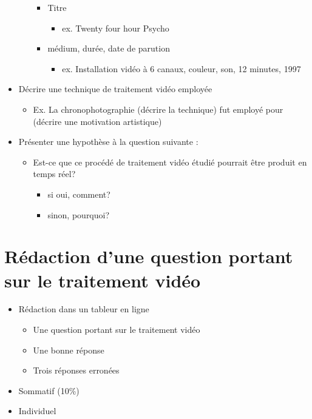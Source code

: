 \documentclass[
]{book}
\providecommand{\tightlist}{%
  \setlength{\itemsep}{0pt}\setlength{\parskip}{0pt}}
\begin{document}
\begin{itemize}
\begin{itemize}
    \begin{itemize}
    \tightlist
    \item
      Titre

      \begin{itemize}
      \tightlist
      \item
        ex. Twenty four hour Psycho
      \end{itemize}
    \item
      médium, durée, date de parution

      \begin{itemize}
      \tightlist
      \item
        ex. Installation vidéo à 6 canaux, couleur, son, 12 minutes, 1997
      \end{itemize}
    \end{itemize}
  \end{itemize}
\item
  Décrire une technique de traitement vidéo employée

  \begin{itemize}
  \tightlist
  \item
    Ex. La chronophotographie (décrire la technique) fut employé pour (décrire une motivation artistique)
  \end{itemize}
\item
  Présenter une hypothèse à la question suivante :

  \begin{itemize}
  \tightlist
  \item
    Est-ce que ce procédé de traitement vidéo étudié pourrait être produit en temps réel?

    \begin{itemize}
    \tightlist
    \item
      si oui, comment?
    \item
      sinon, pourquoi?
    \end{itemize}
  \end{itemize}
\end{itemize}

\hypertarget{sommatif_2}{%
\section{Rédaction d'une question portant sur le traitement vidéo}\label{sommatif_2}}

\begin{itemize}
\tightlist
\item
  Rédaction dans un tableur en ligne

  \begin{itemize}
  \tightlist
  \item
    Une question portant sur le traitement vidéo
  \item
    Une bonne réponse
  \item
    Trois réponses erronées\\
  \end{itemize}
\item
  Sommatif (10\%)
\item
  Individuel
\end{itemize}
\end{document}
